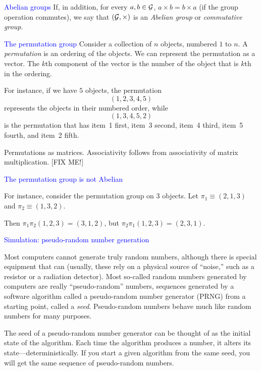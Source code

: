 \documentclass[landscape]{slides}
\newcommand{\cG}{{\cal G}}
\newcommand{\beq}{\begin{equation}}
\newcommand{\eeq}{\end{equation}}
\begin{document}
\begin{slide}
{\textcolor{blue}{Abelian groups}}
        If, in addition, for every $a, b \in \cG$,  $a \times b = b \times a$ (if the group
        operation commutes), we say that $(\cG, \times)$ is an {\em Abelian group\/}
        or {\em commutative group\/}.
\end{slide}


\begin{slide}
{\textcolor{blue}{The permutation group}}
Consider a collection of $n$ objects, numbered $1$ to $n$.
A {\em permutation\/} is an ordering of the objects.
We can represent the permutation as a vector.
The $k$th component of the vector is the number of the object
that is $k$th in the ordering.

For instance, if we have $5$ objects, the permutation
\beq
       (1, 2, 3, 4, 5)
\eeq
represents the objects in their numbered order, while
\beq
      (1, 3, 4, 5, 2)
\eeq
is the permutation that has item~1 first, item~3 second, 
item~4 third, item~5 fourth, and item~2 fifth.


Permutations as matrices. 
 Associativity follows from associativity of matrix multiplication.
[FIX ME!]

\end{slide}


\begin{slide}
{\textcolor{blue}{The permutation group is not Abelian}}

For instance, consider the permutation group on 3 objects.  
Let $\pi_1 \equiv (2, 1, 3)$ and $\pi_2 \equiv (1, 3, 2)$.

Then $\pi_1 \pi_2 (1, 2, 3) = (3, 1, 2)$, but $\pi_2 \pi_1 (1, 2, 3) = (2, 3, 1)$.

\end{slide}


\begin{slide}
{\textcolor{blue}{Simulation: pseudo-random number generation}}

        Most computers cannot generate truly random numbers, although
	there is special equipment that can (usually, these rely on
	a physical source of ``noise,'' such as a resistor or a
	radiation detector).
	Most so-called random numbers generated by computers are really
	``pseudo-random'' numbers, sequences generated by a software algorithm
	called a pseudo-random number generator (PRNG)
	from a starting point, called a {\em seed\/}.
	Pseudo-random numbers behave much like random numbers for many purposes.

	The seed of a pseudo-random number generator can be thought of as the initial
	state of the algorithm.
	Each time the algorithm produces a number, it alters its state---deterministically.
	If you start a given algorithm from the same seed, you will get
	the same sequence of pseudo-random numbers.

\end{slide}
\end{document}
